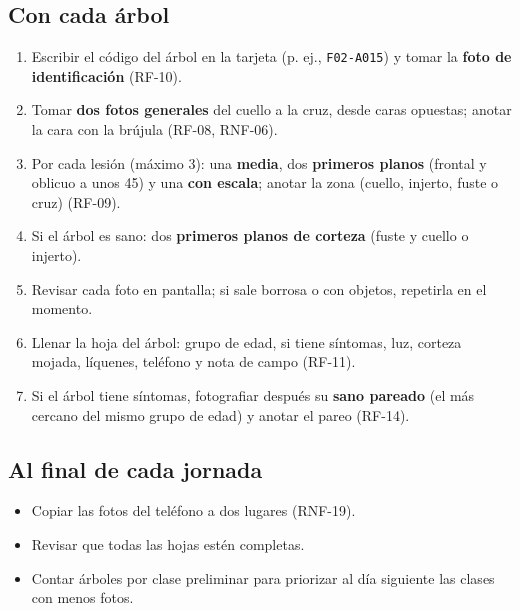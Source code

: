 \documentclass[11pt]{article}
\begin{document}
\subsection{Con cada árbol}
\begin{enumerate}[leftmargin=1.2em,itemsep=2pt,topsep=2pt]
\item Escribir el código del árbol en la tarjeta (p. ej., \nolinkurl{F02-A015}) y tomar la \textbf{foto de identificación} (RF-10).
\item Tomar \textbf{dos fotos generales} del cuello a la cruz, desde caras opuestas; anotar la cara con la brújula (RF-08, RNF-06).
\item Por cada lesión (máximo 3): una \textbf{media}, dos \textbf{primeros planos} (frontal y oblicuo a unos 45\textdegree{}) y una \textbf{con escala}; anotar la zona (cuello, injerto, fuste o cruz) (RF-09).
\item Si el árbol es sano: dos \textbf{primeros planos de corteza} (fuste y cuello o injerto).
\item Revisar cada foto en pantalla; si sale borrosa o con objetos, repetirla en el momento.
\item Llenar la hoja del árbol: grupo de edad, si tiene síntomas, luz, corteza mojada, líquenes, teléfono y nota de campo (RF-11).
\item Si el árbol tiene síntomas, fotografiar después su \textbf{sano pareado} (el más cercano del mismo grupo de edad) y anotar el pareo (RF-14).
\end{enumerate}
\subsection{Al final de cada jornada}
\begin{itemize}[leftmargin=1.2em,itemsep=2pt,topsep=2pt]
\item Copiar las fotos del teléfono a dos lugares (RNF-19).
\item Revisar que todas las hojas estén completas.
\item Contar árboles por clase preliminar para priorizar al día siguiente las clases con menos fotos.
\end{itemize}
\end{document}
